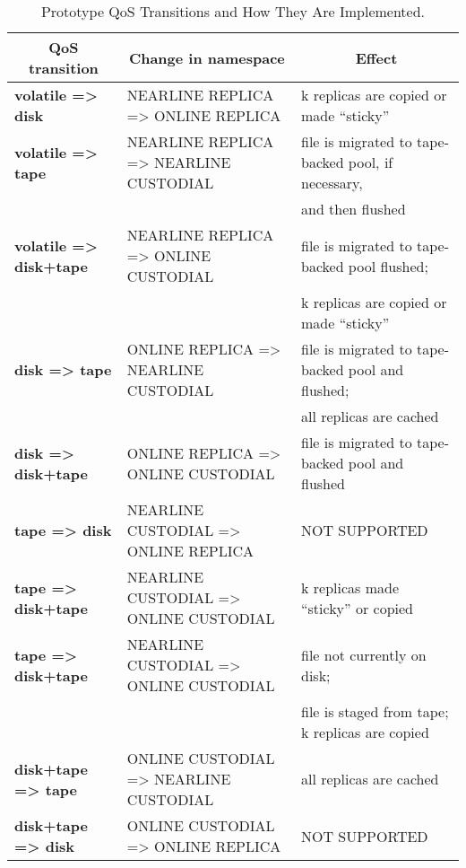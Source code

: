 \documentclass{webofc}
\begin{document}
\begin{table}[H]
\scriptsize
\centering
\caption{Prototype QoS Transitions and How They Are Implemented.}
\label{tab-2}       %
\begin{tabular}{lll}
\hline
 \multicolumn{1}{c}{QoS transition} &  \multicolumn{1}{c}{Change in namespace} &  \multicolumn{1}{c}{Effect} \\\hline
{\bf volatile => disk} &  NEARLINE REPLICA => ONLINE REPLICA &  k replicas are copied or made “sticky” \\
{\bf volatile => tape} & NEARLINE REPLICA => NEARLINE CUSTODIAL & file is migrated to tape-backed pool, if necessary,\\
                       &                                       &  and then flushed \\
{\bf volatile => disk+tape} &  NEARLINE REPLICA => ONLINE CUSTODIAL &  file is migrated to tape-backed pool flushed; \\
                          &                                       & k replicas are copied or made “sticky” \\
{\bf disk => tape } &  ONLINE REPLICA => NEARLINE CUSTODIAL &  file is migrated to tape-backed pool and flushed; \\
                   &                                        &         all replicas are cached \\ 
{\bf disk => disk+tape } & ONLINE REPLICA => ONLINE CUSTODIAL & file is migrated to tape-backed pool and flushed \\
{\bf tape => disk} & NEARLINE CUSTODIAL => ONLINE REPLICA & NOT SUPPORTED \\ 
{\bf tape => disk+tape} & NEARLINE CUSTODIAL => ONLINE CUSTODIAL& k replicas made ``sticky'' or copied \\ 
{\bf tape => disk+tape } &  NEARLINE CUSTODIAL => ONLINE CUSTODIAL &  file not currently on disk;\\
                         &                                        &  file is staged from tape; k replicas are copied \\ 
{\bf disk+tape => tape} &  ONLINE CUSTODIAL => NEARLINE CUSTODIAL &  all replicas are cached \\
{\bf disk+tape => disk}  & ONLINE CUSTODIAL => ONLINE REPLICA & NOT SUPPORTED \\\hline
\end{tabular}
\vspace*{5cm}  %
\end{table}
\end{document}
